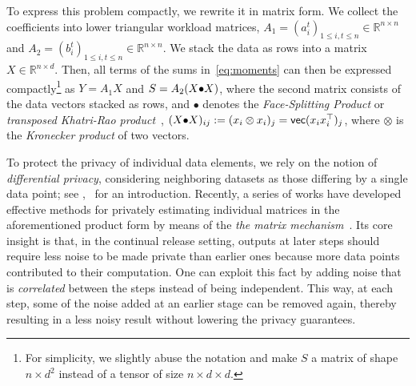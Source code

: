 To express this problem compactly, we rewrite it in matrix form. 
%
We collect the coefficients into lower triangular workload matrices, 
$A_1 = (a_{i}^t)_{1 \le i,t\le n} \in \mathbb{R}^{n \times n}$ and 
$A_2 = (b_{i}^t)_{1 \le i,t\le n} \in \mathbb{R}^{n \times n}$. 
%
We stack the data as rows into a matrix $X\in\mathbb{R}^{n\times d}$.
%
Then, all terms of the sums in~\eqref{eq:moments} can then be expressed compactly\footnote{For simplicity, we slightly abuse the notation and make $S$ a matrix of shape $n\times d^2$ instead of a tensor of size $n\times d\times d$.} as $Y=A_1X$ and $S=A_2(X \operatorname{\!\bullet\!} X)$, where the second 
 matrix consists of the data vectors stacked as rows, and $\bullet$ denotes the \emph{Face-Splitting Product} or \emph{transposed Khatri-Rao product}~\citep{esteve2009}, $(X \operatorname{\!\bullet\!} X)_{ij}:= (x_i \otimes x_i)_j = \textsf{vec}(x_i x_i^\top)_j$, where $\otimes$ is the \textit{Kronecker product} of two vectors.

To protect the privacy of individual data elements, we rely on the notion of \emph{differential privacy}, considering neighboring datasets as those differing by a single data point; see \eg,~\citet{dwork2014algorithmic} for an introduction.
%
Recently, a series of works have developed effective methods for privately estimating individual matrices in the aforementioned product form by means of the \emph{the matrix mechanism}~\citep{li2015matrix, CNPBINDPL, Denisov,MultiEpoch,dvijotham2024efficient,kalinin2024,henzinger2024, henzinger2025improved, fichtenberger2023constant, henzinger2023almost, BandedMatrix,Kairouz,efficient_streaming}.
%
Its core insight is that, in the continual release setting, outputs at later steps should require less noise to be made private than earlier ones because more data points contributed to their computation. 
%
One can exploit this fact by adding noise that is \emph{correlated} between the steps instead of being independent.
%
This way, at each step, some of the noise added at an earlier stage can be removed again, thereby resulting in a less noisy result without lowering the privacy guarantees.

